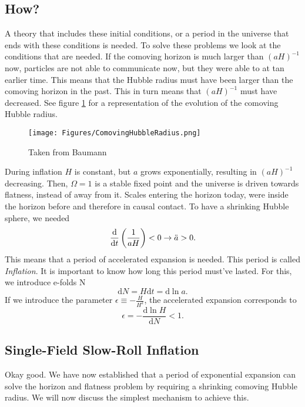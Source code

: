 \documentclass[12pt]{article}
\begin{document}
\subsection{How?}
A theory that includes these initial conditions, or a period in the universe that ends with these conditions is needed. To solve these problems we look at the conditions that are needed. If the comoving horizon is much larger than $(aH)^{-1}$ now, particles are not able to communicate now, but they were able to at tan earlier time. This means that the Hubble radius must have been larger than the comoving horizon in the past. This in turn means that $(aH)^{-1}$ must have decreased. See figure \ref{fig:hubble_radius} for a representation of the evolution of the comoving Hubble radius. 
\begin{figure}
    \centering
    \texttt{[image: Figures/ComovingHubbleRadius.png]}
    \caption{Taken from Baumann}
    \label{fig:hubble_radius}
\end{figure}
During inflation $H$ is constant, but $a$ grows exponentially, resulting in $(aH)^{-1}$ decreasing. Then, $\Omega = 1$ is a stable fixed point and the universe is driven towards flatness, instead of away from it. Scales entering the horizon today, were inside the horizon before and therefore in causal contact. To have a shrinking Hubble sphere, we needed
\begin{equation}
    \frac{\mathrm{d}}{\mathrm{d}t}\left(\frac{1}{aH}\right) < 0\\ 
    \rightarrow \ddot{a} > 0.
\end{equation}
This means that a period of accelerated expansion is needed. This period is called \textit{Inflation}. It is important to know how long this period must've lasted. For this, we introduce e-folds N
\begin{equation}
    \mathrm{d}N = H\mathrm{d}t = \mathrm{d}\ln a.
\end{equation}
If we introduce the parameter $\epsilon \equiv - \frac{ \dot{H}}{H^2}$, the accelerated expansion corresponds to 
\begin{equation}
    \epsilon = - \frac{\mathrm{d}\ln H}{\mathrm{d}N}<1.
\end{equation}

\subsection{Single-Field Slow-Roll Inflation}
Okay good. We have now established that a period of exponential expansion can solve the horizon and flatness problem by requiring a shrinking comoving Hubble radius. We will now discuss the simplest mechanism to achieve this. 
\end{document}
